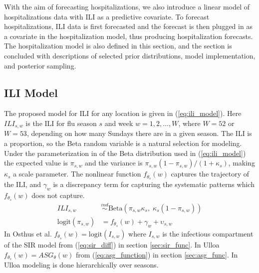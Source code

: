 With the aim of forecasting hospitalizations, we also introduce a linear 
model of hospitalizations data with ILI as a predictive covariate. To forecast 
hospitalizations, ILI data is first forecasted and the forecast is then 
plugged in as a covariate in the hospitalization model, thus producing 
hospitalization forecasts. The hospitalization model is also defined in this 
section, and the section is concluded with descriptions of selected prior 
distributions, model implementation, and posterior sampling.



\subsection{ILI Model} \label{sec:ili_model}

The proposed model for ILI for any location is given in (\ref{eq:ili_model}). 
Here $ILI_{s,w}$ is the ILI for flu season $s$ and week $w = 1, 2, ..., W$, 
where $W = 52$ or $W = 53$, depending on how many Sundays there are in a given 
season. The ILI is a proportion, so the Beta random variable is a natural 
selection for modeling. Under the parameterization in of the Beta distribution 
used in (\ref{eq:ili_model}) the expected value is $\pi_{s,w}$ and the 
variance is $\pi_{s,w}(1 - \pi_{s,w})/(1 + \kappa_s)$, making $\kappa_s$ a 
scale parameter. The nonlinear function $f_{\theta_s}(w)$ captures the 
trajectory of the ILI, and $\gamma_w$ is a discrepancy term for capturing the 
systematic patterns which $f_{\theta_s}(w)$ does not capture. 
\begin{equation}
\begin{aligned}
    \label{eq:ili_model}
        ILI_{s,w} &\overset{ind}{\sim} \text{Beta}(\pi_{s,w}\kappa_s,\; \kappa_s(1 - \pi_{s,w})) \\
        \text{logit}(\pi_{s,w}) &= f_{\theta_s}(w) + \gamma_w + \upsilon_{s,w}
\end{aligned}
\end{equation}
In Osthus et al. \cite[]{osthus2019dynamic} 
$f_{\theta_s}(w) = \text{logit}(I_{s,w})$ where $I_{s,w}$ is the infectious 
compartment of the SIR model from (\ref{eq:sir_diff}) in section 
\ref{sec:sir_func}. In Ulloa \cite[]{ulloa2019} 
$f_{\theta_s}(w) = ASG_{\theta}(w)$ from (\ref{eq:asg_function}) in section 
\ref{sec:asg_func}. In Ulloa \cite[]{ulloa2019} modeling is done hierarchically 
over seasons. 



